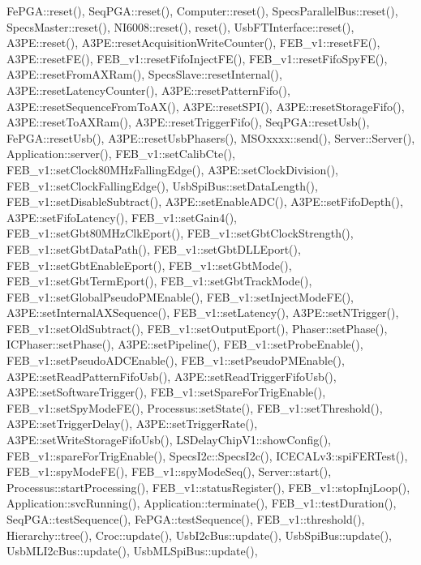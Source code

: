 Fe\+P\+G\+A\+::reset(), Seq\+P\+G\+A\+::reset(), Computer\+::reset(), Specs\+Parallel\+Bus\+::reset(), Specs\+Master\+::reset(), N\+I6008\+::reset(), reset(), Usb\+F\+T\+Interface\+::reset(), A3\+P\+E\+::reset(), A3\+P\+E\+::reset\+Acquisition\+Write\+Counter(), F\+E\+B\+\_\+v1\+::reset\+F\+E(), A3\+P\+E\+::reset\+F\+E(), F\+E\+B\+\_\+v1\+::reset\+Fifo\+Inject\+F\+E(), F\+E\+B\+\_\+v1\+::reset\+Fifo\+Spy\+F\+E(), A3\+P\+E\+::reset\+From\+A\+X\+Ram(), Specs\+Slave\+::reset\+Internal(), A3\+P\+E\+::reset\+Latency\+Counter(), A3\+P\+E\+::reset\+Pattern\+Fifo(), A3\+P\+E\+::reset\+Sequence\+From\+To\+A\+X(), A3\+P\+E\+::reset\+S\+P\+I(), A3\+P\+E\+::reset\+Storage\+Fifo(), A3\+P\+E\+::reset\+To\+A\+X\+Ram(), A3\+P\+E\+::reset\+Trigger\+Fifo(), Seq\+P\+G\+A\+::reset\+Usb(), Fe\+P\+G\+A\+::reset\+Usb(), A3\+P\+E\+::reset\+Usb\+Phasers(), M\+S\+Oxxxx\+::send(), Server\+::\+Server(), Application\+::server(), F\+E\+B\+\_\+v1\+::set\+Calib\+Cte(), F\+E\+B\+\_\+v1\+::set\+Clock80\+M\+Hz\+Falling\+Edge(), A3\+P\+E\+::set\+Clock\+Division(), F\+E\+B\+\_\+v1\+::set\+Clock\+Falling\+Edge(), Usb\+Spi\+Bus\+::set\+Data\+Length(), F\+E\+B\+\_\+v1\+::set\+Disable\+Subtract(), A3\+P\+E\+::set\+Enable\+A\+D\+C(), A3\+P\+E\+::set\+Fifo\+Depth(), A3\+P\+E\+::set\+Fifo\+Latency(), F\+E\+B\+\_\+v1\+::set\+Gain4(), F\+E\+B\+\_\+v1\+::set\+Gbt80\+M\+Hz\+Clk\+Eport(), F\+E\+B\+\_\+v1\+::set\+Gbt\+Clock\+Strength(), F\+E\+B\+\_\+v1\+::set\+Gbt\+Data\+Path(), F\+E\+B\+\_\+v1\+::set\+Gbt\+D\+L\+L\+Eport(), F\+E\+B\+\_\+v1\+::set\+Gbt\+Enable\+Eport(), F\+E\+B\+\_\+v1\+::set\+Gbt\+Mode(), F\+E\+B\+\_\+v1\+::set\+Gbt\+Term\+Eport(), F\+E\+B\+\_\+v1\+::set\+Gbt\+Track\+Mode(), F\+E\+B\+\_\+v1\+::set\+Global\+Pseudo\+P\+M\+Enable(), F\+E\+B\+\_\+v1\+::set\+Inject\+Mode\+F\+E(), A3\+P\+E\+::set\+Internal\+A\+X\+Sequence(), F\+E\+B\+\_\+v1\+::set\+Latency(), A3\+P\+E\+::set\+N\+Trigger(), F\+E\+B\+\_\+v1\+::set\+Old\+Subtract(), F\+E\+B\+\_\+v1\+::set\+Output\+Eport(), Phaser\+::set\+Phase(), I\+C\+Phaser\+::set\+Phase(), A3\+P\+E\+::set\+Pipeline(), F\+E\+B\+\_\+v1\+::set\+Probe\+Enable(), F\+E\+B\+\_\+v1\+::set\+Pseudo\+A\+D\+C\+Enable(), F\+E\+B\+\_\+v1\+::set\+Pseudo\+P\+M\+Enable(), A3\+P\+E\+::set\+Read\+Pattern\+Fifo\+Usb(), A3\+P\+E\+::set\+Read\+Trigger\+Fifo\+Usb(), A3\+P\+E\+::set\+Software\+Trigger(), F\+E\+B\+\_\+v1\+::set\+Spare\+For\+Trig\+Enable(), F\+E\+B\+\_\+v1\+::set\+Spy\+Mode\+F\+E(), Processus\+::set\+State(), F\+E\+B\+\_\+v1\+::set\+Threshold(), A3\+P\+E\+::set\+Trigger\+Delay(), A3\+P\+E\+::set\+Trigger\+Rate(), A3\+P\+E\+::set\+Write\+Storage\+Fifo\+Usb(), L\+S\+Delay\+Chip\+V1\+::show\+Config(), F\+E\+B\+\_\+v1\+::spare\+For\+Trig\+Enable(), Specs\+I2c\+::\+Specs\+I2c(), I\+C\+E\+C\+A\+Lv3\+::spi\+F\+E\+R\+Test(), F\+E\+B\+\_\+v1\+::spy\+Mode\+F\+E(), F\+E\+B\+\_\+v1\+::spy\+Mode\+Seq(), Server\+::start(), Processus\+::start\+Processing(), F\+E\+B\+\_\+v1\+::status\+Register(), F\+E\+B\+\_\+v1\+::stop\+Inj\+Loop(), Application\+::svc\+Running(), Application\+::terminate(), F\+E\+B\+\_\+v1\+::test\+Duration(), Seq\+P\+G\+A\+::test\+Sequence(), Fe\+P\+G\+A\+::test\+Sequence(), F\+E\+B\+\_\+v1\+::threshold(), Hierarchy\+::tree(), Croc\+::update(), Usb\+I2c\+Bus\+::update(), Usb\+Spi\+Bus\+::update(), Usb\+M\+L\+I2c\+Bus\+::update(), Usb\+M\+L\+Spi\+Bus\+::update(), 